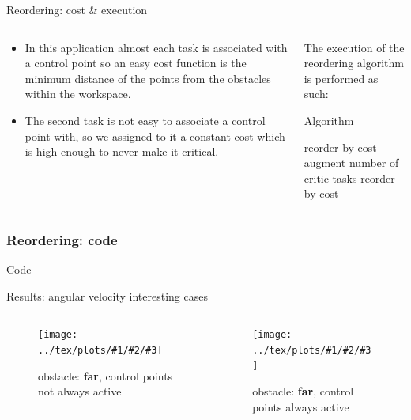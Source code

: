 \documentclass[11pt]{beamer}
\newcommand{\img}[4]{\texttt{[image: ../tex/plots/\#1/\#2/\#3]}}
\begin{document}
\begin{frame}{Reordering: cost \& execution}
\begin{columns}

\begin{column}{.4\textwidth}
\begin{itemize}
\item In this application almost each task is associated with a control point so an easy cost function is the minimum distance of the points from the obstacles within the workspace.
\item The second task is not easy to associate a control point with, so we assigned to it a constant cost which is high enough to never make it critical.
\end{itemize}
\end{column}

\begin{column}{.6\textwidth}
The execution of the reordering algorithm is performed as such:
\begin{block}{Algorithm}
\begin{algorithmic}[1]
\State reorder by cost
\State augment number of critic tasks
\EndIf
\EndFor
{}
\State reorder by cost
\EndFor
\end{algorithmic}
\end{block}
\end{column}

\end{columns}
\end{frame}

\begin{frame}[fragile]
\frametitle{Reordering: code}
\begin{block}{Code}
\begin{adjustbox}{width=.7\textwidth, height=.2\textwidth}

\end{adjustbox}
\end{block}
\end{frame}

\begin{frame}{Results: angular velocity interesting cases}
\begin{columns}
\begin{column}{.5\textwidth}
\begin{figure}[H]
\img{far}{notAlways}{joint_velocities.eps}{.4}
\caption{obstacle: \textbf{far}, control points not always active}
\end{figure}
\end{column}
\begin{column}{.5\textwidth}
\begin{figure}[H]
\img{far}{always}{joint_velocities.eps}{.4}
\caption{obstacle: \textbf{far}, control points always active}
\end{figure}
\end{column}
\end{columns}
\end{frame}
\end{document}

